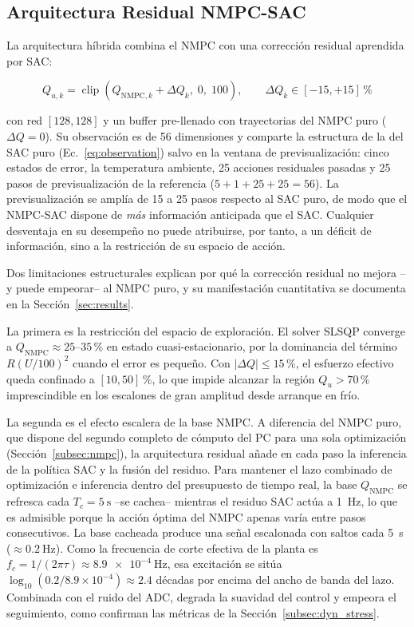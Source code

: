 \documentclass[processes,article,submit,moreauthors,pdftex]{Definitions/mdpi}
\newcommand{\Qu}{Q_u}
\begin{document}
\subsection{Arquitectura Residual NMPC-SAC}
\label{subsec:hybrid}

La arquitectura híbrida combina el NMPC con una corrección residual
aprendida por SAC:

\begin{equation}
  \label{eq:hybrid}
  Q_{u,k} = \operatorname{clip}\!\left(Q_{\mathrm{NMPC},k} + \Delta Q_k,\; 0,\; 100\right),
  \qquad \Delta Q_k \in [-15, +15]\,\%
\end{equation}

con red $[128,128]$ y un buffer pre-llenado con trayectorias del NMPC puro
($\Delta Q = 0$). Su observación es de 56 dimensiones y comparte la
estructura de la del SAC puro (Ec.~\eqref{eq:observation}) salvo en la
ventana de previsualización: cinco estados de error, la temperatura
ambiente, 25 acciones residuales pasadas y 25 pasos de previsualización de
la referencia ($5+1+25+25=56$). La previsualización se amplía de 15 a 25
pasos respecto al SAC puro, de modo que el NMPC-SAC dispone de \emph{más}
información anticipada que el SAC. Cualquier desventaja en su desempeño no
puede atribuirse, por tanto, a un déficit de información, sino a la
restricción de su espacio de acción.

Dos limitaciones estructurales explican por qué la corrección residual no
mejora --y puede empeorar-- al NMPC puro, y su manifestación cuantitativa se
documenta en la Sección~\ref{sec:results}.

La primera es la restricción del espacio de exploración. El solver SLSQP
converge a $Q_{\mathrm{NMPC}} \approx 25$--$35\,\%$ en estado
cuasi-estacionario, por la dominancia del término $R(U/100)^2$ cuando el
error es pequeño. Con $|\Delta Q| \leq 15\,\%$, el esfuerzo efectivo queda
confinado a $[10, 50]\,\%$, lo que impide alcanzar la región $\Qu > 70\,\%$
imprescindible en los escalones de gran amplitud desde arranque en frío.

La segunda es el efecto escalera de la base NMPC. A diferencia del NMPC puro,
que dispone del segundo completo de cómputo del PC para una sola optimización
(Sección~\ref{subsec:nmpc}), la arquitectura residual añade en cada paso la
inferencia de la política SAC y la fusión del residuo. Para mantener el lazo
combinado de optimización e inferencia dentro del presupuesto de tiempo real,
la base $Q_{\mathrm{NMPC}}$ se refresca cada $T_c = \SI{5}{\second}$ --se
cachea-- mientras el residuo SAC actúa a \SI{1}{\hertz}, lo que es admisible
porque la acción óptima del NMPC apenas varía entre pasos consecutivos. La
base cacheada produce una señal escalonada con saltos cada \SI{5}{\second}
($\approx \SI{0.2}{\hertz}$). Como la frecuencia de corte efectiva de la
planta es $f_c = 1/(2\pi\tau) \approx \SI{8.9e-4}{\hertz}$, esa excitación se
sitúa $\log_{10}(0.2/8.9\times10^{-4}) \approx 2.4$ décadas por encima del
ancho de banda del lazo. Combinada con el ruido del ADC, degrada la suavidad
del control y empeora el seguimiento, como confirman las métricas de la
Sección~\ref{subsec:dyn_stress}.
\end{document}
